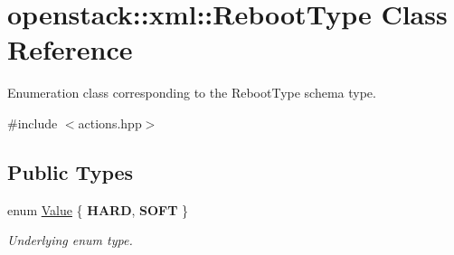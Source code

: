 \hypertarget{classopenstack_1_1xml_1_1RebootType}{
\section{openstack::xml::RebootType Class Reference}
\label{classopenstack_1_1xml_1_1RebootType}
}


Enumeration class corresponding to the RebootType schema type.  




{\ttfamily \#include $<$actions.hpp$>$}

\subsection*{Public Types}
\begin{DoxyCompactItemize}
\item 
enum \hyperlink{classopenstack_1_1xml_1_1RebootType_afe8138afe9dd78bfeaae341a94d6d793}{Value} \{ {\bfseries HARD}, 
{\bfseries SOFT}
 \}
\begin{DoxyCompactList}\small\item\em Underlying enum type. \item\end{DoxyCompactList}\end{DoxyCompactItemize}
